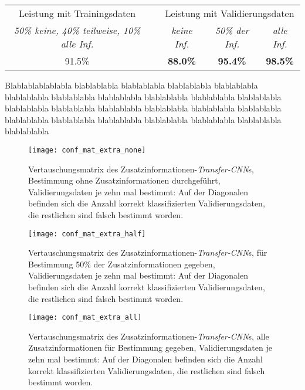 \begin{table}[h]
	\begin{center}
		\def\arraystretch{1.4}
		\begin{tabular}{ c c c c c}
			Leistung mit Trainingsdaten &\qquad\qquad\qquad& \multicolumn{3}{c}{Leistung mit Validierungsdaten} \\
			{\footnotesize \textit{50\% keine, 40\% teilweise, 10\% alle Inf.}}& &{\footnotesize  \textit{keine Inf.}} & {\footnotesize \textit{50\% der Inf.}} &{\footnotesize  \textit{alle Inf.}}\\
			91.5\% &								   & \textbf{88.0\%} & \textbf{95.4\% }& \textbf{98.5\%} \\
		\end{tabular}
	\end{center}
\end{table}
Blablablablablabla blablablabla blablablabla blablablabla blablablabla blablablabla blablablabla blablablabla blablablabla blablablabla blablablabla blablablabla blablablabla blablablabla blablablabla blablablabla blablablabla blablablabla blablablabla blablablabla blablablabla blablablabla blablablabla blablablabla


\begin{sidewaysfigure}
	\centering
	\texttt{[image: conf\_mat\_extra\_none]}
	\caption[Vertauschungsmatrix des Zusatzinformationen-\textit{Transfer-CNN}s ohne Zusatzinformationen]{Vertauschungsmatrix des Zusatzinformationen-\textit{Transfer-CNN}s, Bestimmung ohne Zusatzinformationen durchgeführt, Validierungsdaten je zehn mal bestimmt: Auf der Diagonalen befinden sich die Anzahl korrekt klassifizierten Validierungsdaten, die restlichen sind falsch bestimmt worden.}
	\label{img:conf_mat_extra_none}
\end{sidewaysfigure}


\begin{sidewaysfigure}
\centering
\texttt{[image: conf\_mat\_extra\_half]}
\caption[Vertauschungsmatrix des Zusatzinformationen-\textit{Transfer-CNN}s mit 50\% der Zusatzinformationen]{Vertauschungsmatrix des Zusatzinformationen-\textit{Transfer-CNN}s, für Bestimmung 50\% der Zusatzinformationen gegeben, Validierungsdaten je zehn mal bestimmt: Auf der Diagonalen befinden sich die Anzahl korrekt klassifizierten Validierungsdaten, die restlichen sind falsch bestimmt worden.}
\label{img:conf_mat_extra_half}
\end{sidewaysfigure}


\begin{sidewaysfigure}
\centering
\texttt{[image: conf\_mat\_extra\_all]}
\caption[Vertauschungsmatrix des Zusatzinformationen-\textit{Transfer-CNN}s mit allen Zusatzinformationen]{Vertauschungsmatrix des Zusatzinformationen-\textit{Transfer-CNN}s, alle Zusatzinformationen für Bestimmung gegeben, Validierungsdaten je zehn mal bestimmt: Auf der Diagonalen befinden sich die Anzahl korrekt klassifizierten Validierungsdaten, die restlichen sind falsch bestimmt worden.}
\label{img:conf_mat_extra_all}
\end{sidewaysfigure}